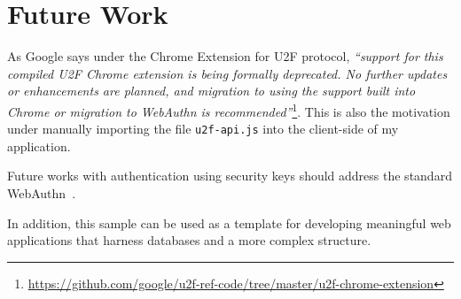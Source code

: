 \section{Future Work}
As Google says under the Chrome Extension for U2F protocol, \emph{``support for this compiled U2F Chrome extension is being formally deprecated. No further updates or enhancements are planned, and migration to using the support built into Chrome or migration to WebAuthn is recommended''}\footnote{\url{https://github.com/google/u2f-ref-code/tree/master/u2f-chrome-extension}}. This is also the motivation under manually importing the file \texttt{u2f-api.js} into the client-side of my application.

Future works with authentication using security keys should address the standard WebAuthn~\cite{webauthn}.

In addition, this sample can be used as a template for developing meaningful web applications that harness databases and a more complex structure.